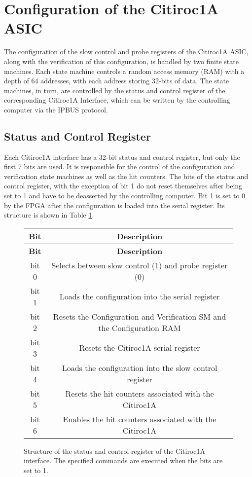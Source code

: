 \section{Configuration of the Citiroc1A ASIC}

The configuration of the slow control and probe registers of the Citiroc1A ASIC,
along with the verification of this configuration, is handled by two finite state machines.
\newline
Each state machine controls a random access memory (RAM) with a depth of 64 addresses,
with each address storing 32-bits of data.
\newline
The state machines, in turn, are controlled by the status and control register of the corresponding Citiroc1A Interface, which can be written by the controlling computer via the IPBUS protocol.
\subsection{Status and Control Register}
Each Citiroc1A interface has a 32-bit status and control register, but only the first 7 bits are used.
It is responsible for the control of the configuration and verification state machines as well as the hit counters.
The bits of the status and control register, with the exception of bit 1
do not reset themselves after being set to 1 and have to be deasserted by the controlling computer.
\newline
Bit 1 is set to 0 by the FPGA after the configuration is loaded into the serial register.
\newline
Its structure is shown in Table \ref{tab:status_control_register}.
\begin{figure}[H]
    \centering
\begin{longtable}{|c|c|}
    \hline
    \textbf{Bit} & \textbf{Description} \\
    \hline
    \endfirsthead
    
    \hline
    \textbf{Bit} & \textbf{Description} \\
    \hline
    \endhead
    
    \hline
    \endfoot
    
    \hline
    \endlastfoot
    bit 0 & Selects between slow control (1) and probe register (0) \\
    bit 1 & Loads the configuration into the serial register\\
    bit 2 & Resets the Configuration and Verification SM and the Configuration RAM \\
    bit 3 & Resets the  Citiroc1A serial register \\
    bit 4 & Loads the configuration into the slow control register \\
    bit 5 & Resets the hit counters associated with the Citiroc1A \\
    bit 6 & Enables the hit counters associated with the Citiroc1A \\
    \hline
    \end{longtable}
    \caption{Structure of the status and control register of the Citiroc1A interface. 
    The specified commands are executed when the bits are set to 1. }  
    \label{tab:status_control_register}
\end{figure}  
  
